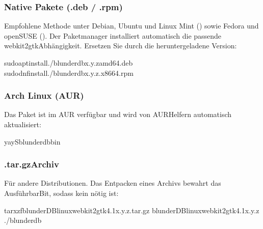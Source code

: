 \documentclass[letterpaper,10pt,german]{sphinxmanual}
\begin{document}
\subsubsection{Native Pakete (.deb / .rpm)}
\label{\detokenize{telecharge_install:paquets-natifs-deb-rpm}}
\sphinxAtStartPar
Empfohlene Methode unter Debian, Ubuntu und Linux Mint () sowie Fedora und openSUSE (). Der Paketmanager installiert automatisch die passende webkit2gtk\sphinxhyphen{}Abhängigkeit. Ersetzen Sie  durch die heruntergeladene Version:

\begin{sphinxVerbatim}[commandchars=\\\{\}]
sudoaptinstall./blunderdb\PYGZus{}x.y.z\PYGZus{}amd64.deb
sudodnfinstall./blunderdb\PYGZhy{}x.y.z.x86\PYGZus{}64.rpm
\end{sphinxVerbatim}


\subsubsection{Arch Linux (AUR)}
\label{\detokenize{telecharge_install:arch-linux-aur}}
\sphinxAtStartPar
Das Paket  ist im AUR verfügbar und wird von AUR\sphinxhyphen{}Helfern automatisch aktualisiert:

\begin{sphinxVerbatim}[commandchars=\\\{\}]
yay\PYGZhy{}Sblunderdb\PYGZhy{}bin
\end{sphinxVerbatim}


\subsubsection{.tar.gz\sphinxhyphen{}Archiv}
\label{\detokenize{telecharge_install:archive-tar-gz}}
\sphinxAtStartPar
Für andere Distributionen. Das Entpacken eines Archivs bewahrt das Ausführbar\sphinxhyphen{}Bit, sodass kein  nötig ist:

\begin{sphinxVerbatim}[commandchars=\\\{\}]
tarxzfblunderDB\PYGZhy{}linux\PYGZhy{}webkit2gtk\PYGZhy{}4.1\PYGZhy{}x.y.z.tar.gz
blunderDB\PYGZhy{}linux\PYGZhy{}webkit2gtk\PYGZhy{}4.1\PYGZhy{}x.y.z
./blunderdb
\end{sphinxVerbatim}
\end{document}
